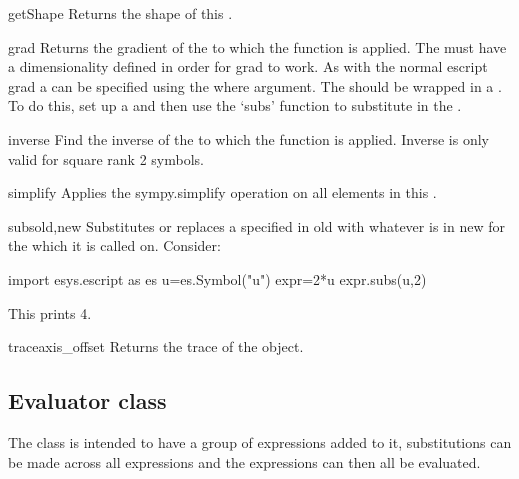 \begin{methoddesc}[Symbol]{getShape}{}
Returns the shape of this \SYMBOL.
\end{methoddesc}
\begin{methoddesc}[Symbol]{grad}{}
Returns the gradient of the \SYMBOL to which the function is applied. The \SYMBOL must have a dimensionality defined in order for grad to work. As with the normal escript grad a \FunctionSpace can be specified using the where argument. The \FunctionSpace should be wrapped in a \SYMBOL. To do this, set up a \SYMBOL and then use the `subs' function to substitute in the \FunctionSpace.
\end{methoddesc}
\begin{methoddesc}[Symbol]{inverse}{}
Find the inverse of the \SYMBOL to which the function is applied. Inverse is only valid for square rank 2 symbols.
\end{methoddesc}
\begin{methoddesc}[Symbol]{simplify}{}
Applies the sympy.simplify operation on all elements in this \SYMBOL.
\end{methoddesc}
\begin{methoddesc}[Symbol]{subs}{old,new}
Substitutes or replaces a \SYMBOL specified in old with whatever is in new for the \SYMBOL which it is called on. Consider:
  \begin{python}
     import esys.escript as es
     u=es.Symbol("u")
     expr=2*u
     expr.subs(u,2)
\end{python}
This prints 4.
\end{methoddesc}
\begin{methoddesc}[Symbol]{trace}{axis_offset}
Returns the trace of the \SYMBOL object.
\end{methoddesc}


\subsection{Evaluator class}
The \EVALUATOR class is intended to have a group of expressions added to it, substitutions can be made across all expressions and the expressions can then all be evaluated.
